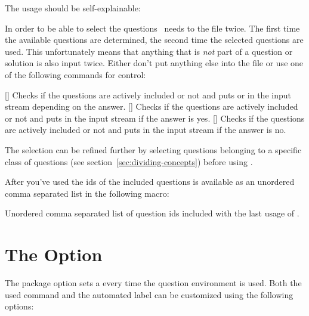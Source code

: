 \documentclass[load-preamble+,scrartcl={DIV10}]{cnltx-doc}
\begin{document}
The usage should be self-explainable:
\begin{sourcecode}
\end{sourcecode}
In order to be able to select the questions \ExSheets\ needs to 
the file twice.  The first time the available questions are determined, the
second time the selected questions are used.  This unfortunately means that
anything that is \emph{not} part of a question or solution is also input
twice.  Either don't put anything else into the file or use one of the
following commands for control:
\begin{commands}
  []
    Checks if the questions are actively included or not and puts  or  in the input stream depending on the answer.
  []
    Checks if the questions are actively included or not and puts  in the input stream if the answer is yes.
  []
    Checks if the questions are actively included or not and puts  in the input stream if the answer is no.
\end{commands}

The selection can be refined further by selecting questions belonging to a
specific class of questions (see section~\ref{sec:dividing-concepts}) before
using .

After you've used  the \acp{id} of the
included questions is available as an unordered comma separated list in the
following macro:
\begin{commands}
    Unordered comma separated list of question \acp{id} included with the last
    usage of .
\end{commands}

\section{The  Option}\label{sec:auto-label-opti}
The package option  sets a
 every time the question environment is used.
Both the used command and the automated label can be customized using the
following options:
\end{document}
